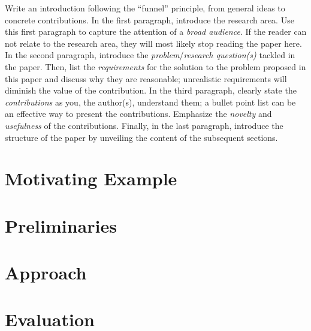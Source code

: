 Write an introduction following the ``funnel'' principle, from general ideas to concrete contributions. In the first paragraph, introduce the research area. Use this first paragraph to capture the attention of a \emph{broad audience}. If the reader can not relate to the research area, they will most likely stop reading the paper here. In the second paragraph, introduce the \emph{problem}/\emph{research question(s)} tackled in the paper. Then, list the \emph{requirements} for the solution to the problem proposed in this paper and discuss why they are reasonable; unrealistic requirements will diminish the value of the contribution. In the third paragraph, clearly state the \emph{contributions} as you, the author(s), understand them; a bullet point list can be an effective way to present the contributions. Emphasize the \emph{novelty} and \emph{usefulness} of the contributions. Finally, in the last paragraph, introduce the structure of the paper by unveiling the content of the subsequent sections.

\section{Motivating Example}
\label{sec:motivating:example}

\section{Preliminaries}
\label{sec:preliminaries}

\section{Approach}
\label{sec:approach}

\section{Evaluation}
\label{sec:evaluation}

